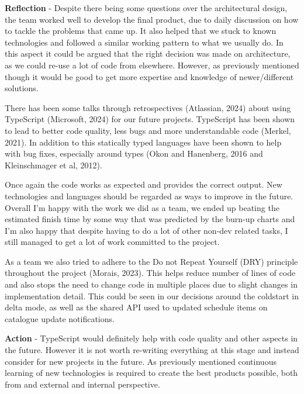   \vspace{0.2cm}
  \textbf{Reflection} - Despite there being some questions over the architectural design, the team worked well to develop the final product, due to daily 
  discussion on how to tackle the problems that came up. It also helped that we stuck to known technologies and followed a similar working pattern to what 
  we usually do. In this aspect it could be argued that the right decision was made on architecture, as we could re-use a lot of code from elsewhere.
  However, as previously mentioned though it would be good to get more expertise and knowledge of newer/different solutions.

  There has been some talks through retrospectives (Atlassian, 2024) about using TypeScript (Microsoft, 2024) for our future projects. TypeScript has been 
  shown to lead to better code quality, less bugs and more understandable code (Merkel, 2021). In addition to this statically typed languages have been shown
  to help with bug fixes, especially around types (Okon and Hanenberg, 2016 and Kleinschmager et al, 2012).

  Once again the code works as expected and provides the correct output. New technologies and languages should be regarded as ways to improve in the future.
  Overall I'm happy with the work we did as a team, we ended up beating the estimated finish time by some way that was predicted by the burn-up charts and 
  I'm also happy that despite having to do a lot of other non-dev related tasks, I still managed to get a lot of work committed to the project.

  As a team we also tried to adhere to the Do not Repeat Yourself (DRY) principle throughout the project (Morais, 2023). This helps reduce number of lines of 
  code and  also stops the need to change code in multiple places due to slight changes in implementation detail. This could be seen in our decisions around the 
  coldstart in delta mode, as well as the shared API used to updated schedule items on catalogue update notifications.

  \vspace{0.2cm}
  \textbf{Action} - TypeScript would definitely help with code quality and other aspects in the future. However it is not worth re-writing everything at this
  stage and instead consider for new projects in the future. As previously mentioned continuous learning of new technologies is required to create the 
  best products possible, both from and external and internal perspective. 
  
